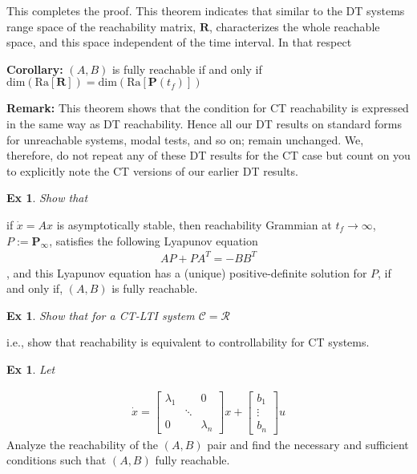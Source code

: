 \documentclass[twoside]{article}
\newtheorem{exmp}[theorem]{Ex}
\begin{document}
%
This completes the proof. This theorem indicates that similar to the DT systems range space of the
reachability matrix, $\mathbf{R}$, characterizes the whole reachable space, and this space independent
of the time interval. In that respect 

\textbf{Corollary:} $(A,B)$ is fully reachable if and only if $\mathrm{dim} \left( \mathrm{Ra} [ \mathbf{R} ] \right) = \mathrm{dim} \left( \mathrm{Ra} [ \textbf{P}(t_f) ] \right)$

\textbf{Remark:} This theorem shows that the condition for CT reachability is expressed in the same way 
as DT reachability. Hence all our DT results on standard forms for unreachable systems, modal tests, and so on; remain unchanged. We, therefore, do not repeat any of these DT results for the CT case but count on you to explicitly note the CT versions of our earlier DT results.

\begin{exmp}
Show that
\end{exmp}
if $\dot{x} = A x$ is asymptotically stable, then reachability Grammian at $t_f \to \infty$, $P := \mathbf{P}_{\infty}$,
satisfies the following Lyapunov equation
%
\begin{align*}
    A P + P A^T = - B B^T
\end{align*}
% 
, and this Lyapunov equation has a (unique) positive-definite solution for $P$,
if and only if, $(A,B)$ is fully reachable.

\begin{exmp}
Show that for a CT-LTI system $\mathcal{C} = \mathcal{R}$
\end{exmp}
i.e., show that reachability is equivalent to controllability for CT systems. 

\begin{exmp}
Let 
\end{exmp}
%
%
\begin{align*}
    \dot{x} = \begin{bmatrix} \lambda_1 & & 0  \\
    & \ddots &
    \\
    0 & &  \lambda_n 
    \end{bmatrix} x + \begin{bmatrix} b_1 \\ \vdots \\ b_n \end{bmatrix} u
\end{align*}
% 
Analyze the reachability of the $(A,B)$ pair and
find the necessary and sufficient conditions such that 
$(A,B)$ fully reachable.
\end{document}
